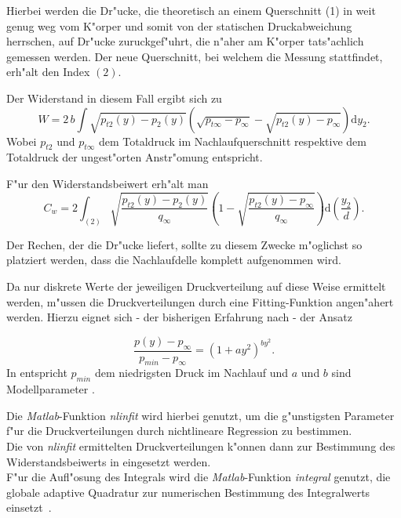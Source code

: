 Hierbei werden die Dr"ucke, die theoretisch an einem Querschnitt (1) in  weit genug weg vom K"orper und somit von der statischen Druckabweichung herrschen, auf Dr"ucke zuruckgef"uhrt, die n"aher am K"orper tats"achlich gemessen werden\cite{Schlichting.2001}.
Der neue Querschnitt, bei welchem die Messung stattfindet, erh"alt den Index $(2)$.

Der Widerstand in diesem Fall ergibt sich zu
\begin{equation}
	\label{eq:widerstand_korrigiert}
	W = 2\,b \int \sqrt{p_{t2}(y) - p_2(y)} \left(\sqrt{p_{t\infty} - p_{\infty}} - \sqrt{p_{t2}(y) - p_{\infty}}\right) \mathrm{d} y_2 .
\end{equation}
Wobei $p_{t2}$ und $p_{t\infty}$ dem Totaldruck im Nachlaufquerschnitt respektive dem Totaldruck der ungest"orten Anstr"omung entspricht.

F"ur den Widerstandsbeiwert erh"alt man
\begin{equation}
	\label{eq:C_w_korrigiert}
	C_w = 2 \int_{(2)} \sqrt{\frac{p_{t2}(y) - p_2(y)}{q_{\infty}}}
	\left(1 - \sqrt{\frac{p_{t2}(y) - p_{\infty}}{q_{\infty}}}\right)  \mathrm{d}\left(\frac{y_{2}}{d}\right).
\end{equation}

Der Rechen, der die Dr"ucke liefert, sollte zu diesem Zwecke m"oglichst so platziert werden, dass die Nachlaufdelle komplett aufgenommen wird. 

Da nur diskrete Werte der jeweiligen Druckverteilung auf diese Weise ermittelt werden, m"ussen die Druckverteilungen durch eine Fitting-Funktion angen"ahert werden. 
Hierzu eignet sich - der bisherigen Erfahrung nach \cite{Oswald.2017} - der Ansatz

	\begin{equation}
	\label{eq:fitting-function}
	\frac{p(y) - p_{\infty}}{p_{min}-p_{\infty}} = (1 +ay^2)^{by^2}.
	\end{equation}
In  entspricht $p_{min}$ dem niedrigsten Druck im Nachlauf und $a$ und $b$ sind Modellparameter \cite{Oswald.2017}.

Die \textit{Matlab}-Funktion \textit{nlinfit} wird hierbei genutzt, um die g"unstigsten Parameter f"ur die Druckverteilungen durch nichtlineare Regression zu bestimmen.\\
Die von \textit{nlinfit} ermittelten Druckverteilungen k"onnen dann zur Bestimmung des Widerstandsbeiwerts in  eingesetzt werden.\\
F"ur die Aufl"osung des Integrals wird die \textit{Matlab}-Funktion \textit{integral} genutzt, die globale adaptive Quadratur zur numerischen Bestimmung des Integralwerts einsetzt~\cite{Oswald.2017}.

